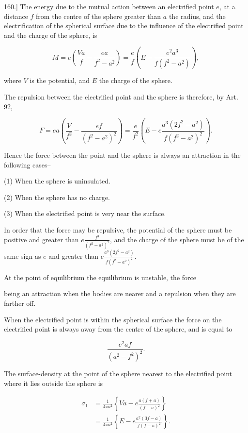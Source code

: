\documentclass[11pt,a4paper]{article}
\begin{document}
160.] The energy due to the mutual action between an electrified point $e$, at a distance $f$ from the centre of the sphere greater than $a$ the radius, and the electrification of the spherical surface due to the influence of the electrified point and the charge of the sphere, is

\begin{equation}\tag{10}
M=e\left(\frac{Va}{f}-\frac{ea}{f^2-a^2}\right)
=\frac{e}{f}\left(E-\frac{e^2a^3}{f(f^2-a^2)}\right),
\end{equation}

where $V$ is the potential, and $E$ the charge of the sphere.

The repulsion between the electrified point and the sphere is therefore, by Art. 92,

\begin{equation}\tag{11}
F=ea\left(\frac{V}{f^2}-\frac{ef}{(f^2-a^2)^2}\right)
=\frac{e}{f^2}\left(E-e\frac{a^3(2f^2-a^2)}{f(f^2-a^2)^2}\right).
\end{equation}

Hence the force between the point and the sphere is always an attraction in the following cases--

(1) When the sphere is uninsulated.

(2) When the sphere has no charge.

(3) When the electrified point is very near the surface.

In order that the force may be repulsive, the potential of the sphere must be positive and greater than $e\frac{f^3}{(f^2-a^2)^2}$, and the charge of the sphere must be of the same sign as $e$ and greater than $e\frac{a^3(2f^2-a^2)}{f(f^2-a^2)^2}$.

At the point of equilibrium the equilibrium is unstable, the force

being an attraction when the bodies are nearer and a repulsion when they are farther off.

When the electrified point is within the spherical surface the force on the electrified point is always away from the centre of the sphere, and is equal to

\[
\frac{e^2af}{(a^2-f^2)^2}.
\]

The surface-density at the point of the sphere nearest to the electrified point where it lies outside the sphere is

\begin{equation}\tag{12}
\begin{split}
\sigma_1&=\frac{1}{4\pi a^2}
\left\{Va-e\frac{a(f+a)}{(f-a)^2}\right\}\\
&=\frac{1}{4\pi a^2}
\left\{E-e\frac{a^2(3f-a)}{f(f-a)^2}\right\}.
\end{split}
\end{equation}
\end{document}
